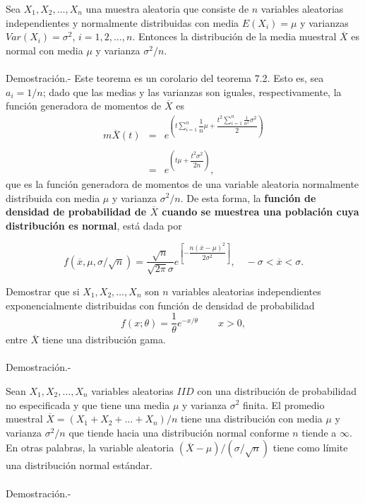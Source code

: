 \begin{teo}
    Sea $X_1,X_2,\ldots,X_n$ una muestra aleatoria que consiste de $n$ variables aleatorias independientes y normalmente distribuidas con media $E(X_i)=\mu$ y varianzas $Var(X_i)=\sigma^2$, $i=1,2,\ldots,n$. Entonces la distribución de la media muestral $\overline{X}$ es normal con media $\mu$ y varianza $\sigma^2/n.$\\\\
	Demostración.-\; Este teorema es un corolario del teorema 7.2. Esto es, sea $a_i=1/n$; dado que las medias y las varianzas son iguales, respectivamente, la función generadora de momentos de $\overline{X}$ es
	$$\begin{array}{rcl}
	    m\overline{X}(t) &=&  e^{\left(t\displaystyle\sum_{i=1}^n \dfrac{1}{n}\mu+\dfrac{t^2\displaystyle\sum_{i=1}^n \frac{1}{n^2}\sigma^2}{2}\right)}\\\\
			     &=&e^{\left(t\mu+\dfrac{t^2\sigma^2}{2n}\right)},
	\end{array}$$
	que es la función generadora de momentos de una variable aleatoria normalmente distribuida con media $\mu$ y varianza $\sigma^2/n$. De esta forma, la \textbf{\boldmath función de densidad de probabilidad de $\overline{X}$ cuando se muestrea una población cuya distribución es normal}, está dada por
	\begin{tcolorbox}
	    $$f\left(\overline{x},\mu,\sigma/\sqrt{n}\right)=\dfrac{\sqrt{n}}{\sqrt{2\pi}\sigma}e^{\left[-\dfrac{n(\overline{x}-\mu)^2}{2\sigma^2}\right]}, \quad -\sigma<\overline{x}<\sigma.$$
	\end{tcolorbox}
\end{teo}

\begin{ejem}
    Demostrar que si $X_1,X_2,\ldots,X_n$ son $n$ variables aleatorias independientes  exponencialmente distribuidas con función de densidad de probabilidad
    $$f(x;\theta)=\dfrac{1}{\theta}e^{-x/\theta}\qquad x>0,$$
    entre $\overline{X}$ tiene una distribución gama.\\\\
	Demostración.-\;
\end{ejem}

\begin{teo}
    Sean $X_1,X_2,\ldots , X_n$ variables aleatorias $IID$ con una distribución de probabilidad no especificada y que tiene una media $\mu$ y varianza $\sigma^2$ finita. El promedio muestral $\overline{X}=\left(X_1+X_2+\ldots + X_n\right)/n$ tiene una distribución con media $\mu$ y varianza $\sigma^2/n$ que tiende hacia una distribución normal conforme $n$ tiende a $\infty$. En otras palabras, la variable aleatoria $(\overline{X}-\mu)/(\sigma/\sqrt{n})$ tiene como límite una distribución normal estándar.\\\\
	Demostración.-\;
\end{teo}
